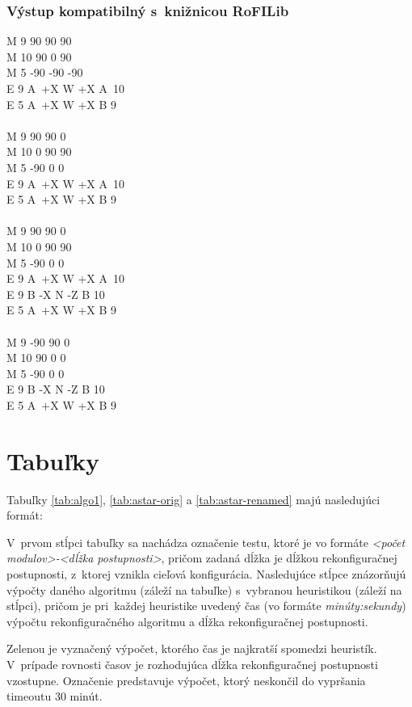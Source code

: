 \documentclass[
  printed, %
  oneside, %
  notable,   %
  nolof,     %
  nolot,     %
]{fithesis3}
\begin{document}
\subsection{Výstup kompatibilný s~knižnicou RoFILib}
M 9 90 90 90 \\
M 10 90 0 90 \\
M 5 -90 -90 -90 \\
E 9 A~+X W +X A~10 \\
E 5 A~+X W +X B 9 \\
\\
M 9 90 90 0 \\
M 10 0 90 90 \\
M 5 -90 0 0 \\
E 9 A~+X W +X A~10 \\
E 5 A~+X W +X B 9 \\
\\
M 9 90 90 0 \\
M 10 0 90 90 \\
M 5 -90 0 0 \\
E 9 A~+X W +X A~10 \\
E 9 B -X N -Z B 10 \\
E 5 A~+X W +X B 9 \\
\\
M 9 -90 90 0 \\
M 10 90 0 0 \\
M 5 -90 0 0 \\
E 9 B -X N -Z B 10 \\
E 5 A~+X W +X B 9

\chapter{Tabuľky}
\label{tab:tables}

Tabuľky \ref{tab:algo1}, \ref{tab:astar-orig} a \ref{tab:astar-renamed} majú nasledujúci formát: 

V~prvom stĺpci tabuľky sa nachádza označenie testu, ktoré je vo formáte \textit{<počet modulov>-<dĺžka postupnosti>}, pričom zadaná dĺžka je dĺžkou rekonfiguračnej postupnosti, z~ktorej vznikla cieľová konfigurácia. Nasledujúce stĺpce znázorňujú výpočty daného algoritmu (záleží na tabuľke) s~vybranou heuristikou (záleží na stĺpci), pričom je pri~každej heuristike uvedený čas (vo formáte \textit{minúty:sekundy}) výpočtu rekonfiguračného algoritmu a dĺžka rekonfiguračnej postupnosti. 

\colorbox{table-green}{Zelenou} je vyznačený výpočet, ktorého čas je najkratší spomedzi heuristík. V~prípade rovnosti časov je rozhodujúca dĺžka rekonfiguračnej postupnosti vzostupne. Označenie \uv{--} predstavuje výpočet, ktorý neskončil do vypršania timeoutu 30 minút. 
\end{document}
